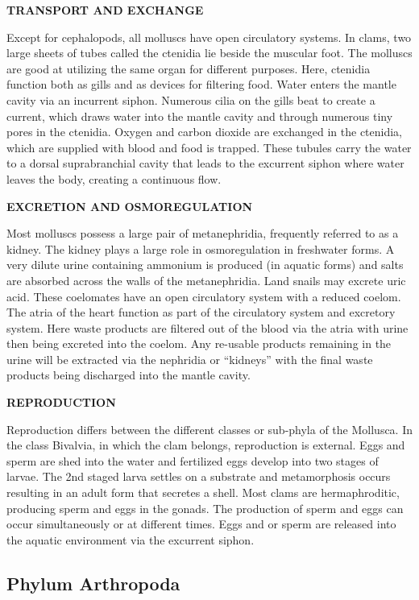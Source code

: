 \documentclass[
]{book}
\begin{document}
\textbf{TRANSPORT AND EXCHANGE}

Except for cephalopods, all molluscs have open circulatory systems. In clams, two large sheets
of tubes called the ctenidia lie beside the muscular foot. The molluscs are good at utilizing the same organ for different purposes. Here, ctenidia function both as gills and as devices for filtering food. Water enters the mantle cavity via an incurrent siphon. Numerous cilia on the gills beat to create a current, which draws water into the mantle cavity and through numerous tiny pores in the ctenidia. Oxygen and carbon dioxide are exchanged in the ctenidia, which are supplied with blood and food is trapped. These tubules carry the water to a dorsal suprabranchial cavity that leads to the excurrent siphon where water leaves the body, creating a continuous flow.

\textbf{EXCRETION AND OSMOREGULATION}

Most molluscs possess a large pair of metanephridia, frequently referred to as a kidney. The kidney plays a large role in osmoregulation in freshwater forms. A very dilute urine containing ammonium is produced (in aquatic forms) and salts are absorbed across the walls of the metanephridia. Land snails may excrete uric acid. These coelomates have an open circulatory system with a reduced coelom. The atria of the heart function as part of the circulatory system and excretory system. Here waste products are filtered out of the blood via the atria with urine then being excreted into the coelom. Any re-usable products remaining in the urine will be extracted via the nephridia or ``kidneys'' with the final waste products being discharged into the mantle cavity.

\textbf{REPRODUCTION}

Reproduction differs between the different classes or sub-phyla of the Mollusca. In the class Bivalvia, in which the clam belongs, reproduction is external. Eggs and sperm are shed into the water and fertilized eggs develop into two stages of larvae. The 2nd staged larva settles on a substrate and metamorphosis occurs resulting in an adult form that secretes a shell. Most clams are hermaphroditic, producing sperm and eggs in the gonads. The production of sperm and eggs can occur simultaneously or at different times. Eggs and or sperm are released into the aquatic environment via the excurrent siphon.

\hypertarget{phylum-arthropoda}{%
\subsection*{Phylum Arthropoda}\label{phylum-arthropoda}}
\end{document}
